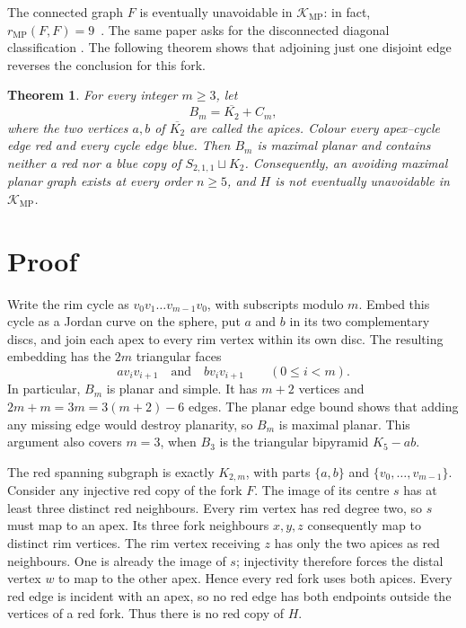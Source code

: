 \documentclass[10pt]{article}
\newtheorem{theorem}{Theorem}
\begin{document}
The connected graph $F$ is eventually unavoidable in
$\mathcal K_{\mathrm{MP}}$: in fact,
$r_{\mathrm{MP}}(F,F)=9$~\cite[Theorem~12]{BaldacchinoCaroMifsud2026}.
The same paper asks for the disconnected diagonal classification
\cite[Problem~2]{BaldacchinoCaroMifsud2026}.  The following theorem shows that
adjoining just one disjoint edge reverses the conclusion for this fork.

\begin{theorem}\label{thm:main}
For every integer $m\geq 3$, let
\[
 B_m=\overline{K_2}+C_m,
\]
where the two vertices $a,b$ of $\overline{K_2}$ are called the apices.
Colour every apex--cycle edge red and every cycle edge blue.  Then $B_m$ is
maximal planar and contains neither a red nor a blue copy of
$S_{2,1,1}\sqcup K_2$.  Consequently, an avoiding maximal planar graph exists
at every order $n\geq 5$, and $H$ is not eventually unavoidable in
$\mathcal K_{\mathrm{MP}}$.
\end{theorem}

\section{Proof}

Write the rim cycle as $v_0v_1\dots v_{m-1}v_0$, with subscripts modulo $m$.
Embed this cycle as a Jordan curve on the sphere, put $a$ and $b$ in its two
complementary discs, and join each apex to every rim vertex within its own
disc.  The resulting embedding has the $2m$ triangular faces
\[
 av_iv_{i+1}\quad\text{and}\quad bv_iv_{i+1}
 \qquad (0\leq i<m).
\]
In particular, $B_m$ is planar and simple.  It has $m+2$ vertices and
$2m+m=3m=3(m+2)-6$ edges.  The planar edge bound shows that adding any missing
edge would destroy planarity, so $B_m$ is maximal planar.  This argument also
covers $m=3$, when $B_3$ is the triangular bipyramid $K_5-ab$.

The red spanning subgraph is exactly $K_{2,m}$, with parts
$\{a,b\}$ and $\{v_0,\ldots,v_{m-1}\}$.  Consider any injective red copy of
the fork $F$.  The image of its centre $s$ has at least three distinct red
neighbours.  Every rim vertex has red degree two, so $s$ must map to an apex.
Its three fork neighbours $x,y,z$ consequently map to distinct rim vertices.
The rim vertex receiving $z$ has only the two apices as red neighbours.  One
is already the image of $s$; injectivity therefore forces the distal vertex
$w$ to map to the other apex.  Hence every red fork uses both apices.  Every
red edge is incident with an apex, so no red edge has both endpoints outside
the vertices of a red fork.  Thus there is no red copy of $H$.
\end{document}
